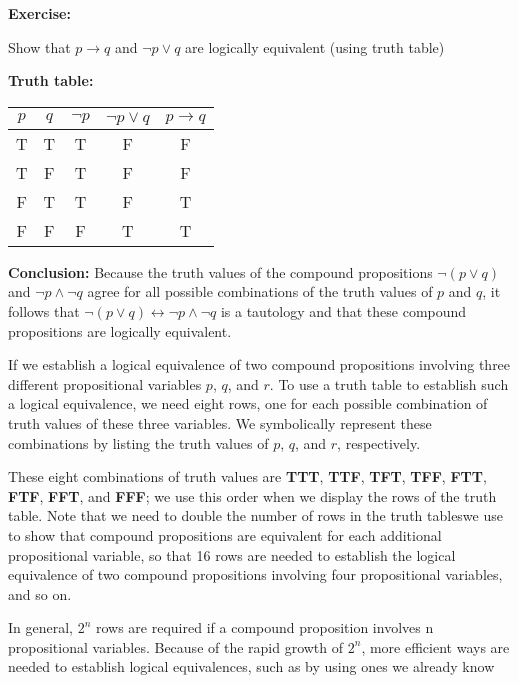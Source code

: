 \begin{tcolorbox}[title=Example 2: Show conditional-disjunction equivalence]
\textbf{Exercise:}  
\begin{center}
Show that $p\rightarrow q $ and $\neg p \lor q$  are logically equivalent (using truth table) 
\end{center}
\textbf{Truth table:}
\begin{center}
\begin{tabular}{|c|c!{\vrule width 1.5pt}c|c|c|}
\hline
{}
$p$ & $q$ & $\neg p$ & $\neg p \lor q$ & $p \rightarrow q$ \\
\hline
T & T & T & F & F   \\
T & F & T & F & F   \\
F & T & T & F & T   \\
F & F & F & T & T   \\
\hline
\end{tabular}    
\end{center}

\textbf{Conclusion:}  
Because the truth values of the compound propositions $\neg (p\lor q) $ and $\neg p \land \neg q$ agree for all possible combinations
of the truth values of $p$ and $q$, it follows that $\neg (p\lor q) \leftrightarrow \neg p \land \neg q$  is a tautology and
that these compound propositions are logically equivalent.
\end{tcolorbox}
\begin{tcolorbox}[colback=white, colframe=gray!60, title=Remark 2]
If we establish a logical equivalence of two compound propositions involving three
different propositional variables $p$, $q$, and $r$. To use a truth table to establish such a logical
equivalence, we need eight rows, one for each possible combination of truth values of these
three variables. We symbolically represent these combinations by listing the truth values of $p$, $q$, and $r$, respectively.
\end{tcolorbox}
\begin{tcolorbox}[colback=white, colframe=gray!60, title=Remark 3]
These eight combinations of truth values are \textbf{TTT}, \textbf{TTF}, \textbf{TFT}, \textbf{TFF}, \textbf{FTT},
\textbf{FTF}, \textbf{FFT}, and \textbf{FFF}; we use this order when we display the rows of the truth table. Note that we
need to double the number of rows in the truth tableswe use to show that compound propositions
are equivalent for each additional propositional variable, so that 16 rows are needed to establish
the logical equivalence of two compound propositions involving four propositional variables,
and so on.
\end{tcolorbox}
\begin{tcolorbox}[colback=white, colframe=gray!60, title=Remark 4]
In general, $2^n$ rows are required if a compound proposition involves n propositional
variables. Because of the rapid growth of $2^n$, more efficient ways are needed to establish logical
equivalences, such as by using ones we already know
\end{tcolorbox}

